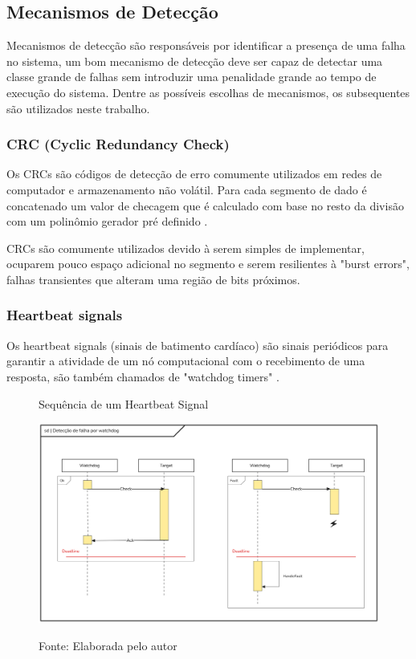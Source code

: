 \subsection{Mecanismos de Detecção}

Mecanismos de detecção são responsáveis por identificar a presença de uma falha no sistema, um bom mecanismo de detecção deve ser capaz de detectar uma classe grande de falhas sem introduzir uma penalidade grande ao tempo de execução do sistema. Dentre as possíveis escolhas de mecanismos, os subsequentes são utilizados neste trabalho.

\subsubsection{CRC (Cyclic Redundancy Check)}

Os CRCs são códigos de detecção de erro comumente utilizados em redes de computador e armazenamento não volátil. Para cada segmento de dado é concatenado um valor de checagem que é calculado com base no resto da divisão com um polinômio gerador pré definido \cite{FaultTolerantSystems}.

CRCs são comumente utilizados devido à serem simples de implementar, ocuparem pouco espaço adicional no segmento e serem resilientes à "burst errors", falhas transientes que alteram uma região de bits próximos.

\subsubsection{Heartbeat signals}

Os heartbeat signals (sinais de batimento cardíaco) são sinais periódicos para garantir a atividade de um nó computacional com o recebimento de uma resposta, são também chamados de "watchdog timers" \cite{DependabilityInEmbeddedSystems}. 

\begin{figure}[H]
    \centering
	\captionsetup{justification=centering}
    \caption{Sequência de um Heartbeat Signal}
    \includegraphics[width=1.0\textwidth]{assets/heartbeat_signal.png}\\
	\captionsetup{justification=raggedright}
    \caption*{Fonte: Elaborada pelo autor}
    \label{fig:heartbeatSignal}
\end{figure}

